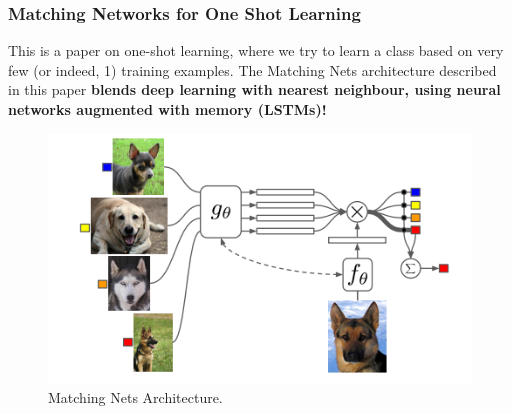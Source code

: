 \subsubsection{Matching Networks for One Shot Learning} 
This is a paper\cite{DBLP:journals/corr/SantoroBBWL16} on one-shot learning, where we try to learn a class based on very few (or indeed, 1) training examples. The Matching Nets architecture described in this paper \textbf{blends deep learning with nearest neighbour, using neural networks augmented with memory (LSTMs)!}\\ 

\begin{figure}
\includegraphics[width=\textwidth]{matching_network.png}
\caption{\label{fig:MATCHING_NETS}{Matching Nets Architecture.}}
\end{figure}

